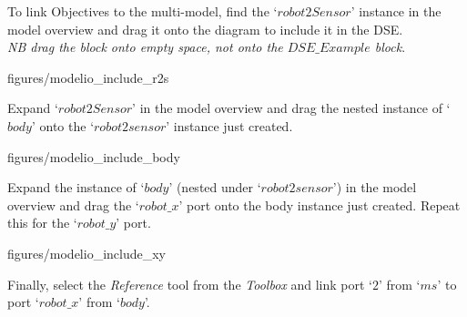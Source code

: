 \documentclass[11pt,a4paper]{../tutorial}
\begin{document}
\begin{instructions}
\newpage

\item To link Objectives to the multi-model, find the `$robot2Sensor$' instance in the model overview and drag it onto the diagram to include it in the DSE. \\ \textit{NB drag the block onto empty space, not onto the $DSE\_Example$ block}.

\begin{center}
\begin{annotation}[width=0.7\linewidth]{figures/modelio_include_r2s}
    \end{annotation}
\end{center}

\item Expand `$robot2Sensor$' in the model overview and drag the nested instance of `$body$' onto the `$robot2sensor$' instance just created.

\begin{center}
\begin{annotation}[width=0.7\linewidth]{figures/modelio_include_body}
    \end{annotation}
\end{center}

\newpage

\item Expand the instance of `$body$' (nested under `$robot2sensor$') in the model overview and drag the `$robot\_x$' port onto the body instance just created. Repeat this for the `$robot\_y$' port.

\begin{center}
\begin{annotation}[width=0.7\linewidth]{figures/modelio_include_xy}
    \end{annotation}
\end{center}

\item \label{obj_link} Finally, select the \emph{Reference} tool from the \emph{Toolbox} and link port `$2$' from `$ms$' to port `$robot\_x$' from `$body$'.


\end{instructions}
\end{document}
